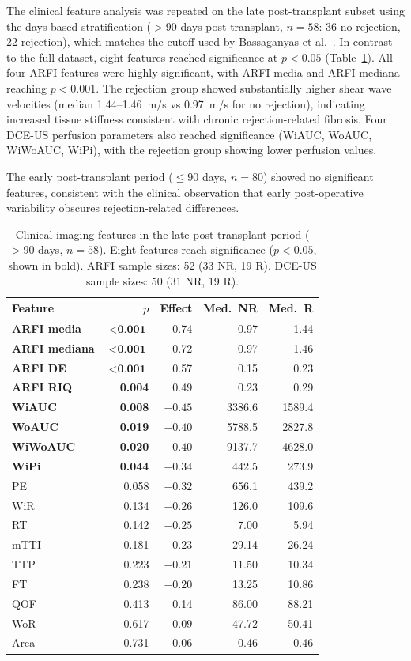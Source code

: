 The clinical feature analysis was repeated on the late post-transplant subset using the days-based stratification ($> 90$ days post-transplant, $n = 58$: 36 no rejection, 22 rejection), which matches the cutoff used by Bassaganyas et al.\ \cite{bassaganyas2025}. In contrast to the full dataset, eight features reached significance at $p < 0.05$ (Table~\ref{tab:clinical_late}). All four ARFI features were highly significant, with ARFI media and ARFI mediana reaching $p < 0.001$. The rejection group showed substantially higher shear wave velocities (median 1.44--1.46~m/s vs 0.97~m/s for no rejection), indicating increased tissue stiffness consistent with chronic rejection-related fibrosis. Four DCE-US perfusion parameters also reached significance (WiAUC, WoAUC, WiWoAUC, WiPi), with the rejection group showing lower perfusion values.

The early post-transplant period ($\leq 90$ days, $n = 80$) showed no significant features, consistent with the clinical observation that early post-operative variability obscures rejection-related differences.

\begin{table}[ht]
\centering
\caption{Clinical imaging features in the late post-transplant period ($> 90$ days, $n = 58$). Eight features reach significance ($p < 0.05$, shown in bold). ARFI sample sizes: 52 (33 NR, 19 R). DCE-US sample sizes: 50 (31 NR, 19 R).}
\label{tab:clinical_late}
\small
\begin{tabular}{lrrrr}
\toprule
Feature & $p$ & Effect & Med.\ NR & Med.\ R \\
\midrule
\textbf{ARFI media} & $< \textbf{0.001}$ & 0.74 & 0.97 & 1.44 \\
\textbf{ARFI mediana} & $< \textbf{0.001}$ & 0.72 & 0.97 & 1.46 \\
\textbf{ARFI DE} & $< \textbf{0.001}$ & 0.57 & 0.15 & 0.23 \\
\textbf{ARFI RIQ} & \textbf{0.004} & 0.49 & 0.23 & 0.29 \\
\textbf{WiAUC} & \textbf{0.008} & $-0.45$ & 3386.6 & 1589.4 \\
\textbf{WoAUC} & \textbf{0.019} & $-0.40$ & 5788.5 & 2827.8 \\
\textbf{WiWoAUC} & \textbf{0.020} & $-0.40$ & 9137.7 & 4628.0 \\
\textbf{WiPi} & \textbf{0.044} & $-0.34$ & 442.5 & 273.9 \\
PE & 0.058 & $-0.32$ & 656.1 & 439.2 \\
WiR & 0.134 & $-0.26$ & 126.0 & 109.6 \\
RT & 0.142 & $-0.25$ & 7.00 & 5.94 \\
mTTI & 0.181 & $-0.23$ & 29.14 & 26.24 \\
TTP & 0.223 & $-0.21$ & 11.50 & 10.34 \\
FT & 0.238 & $-0.20$ & 13.25 & 10.86 \\
QOF & 0.413 & 0.14 & 86.00 & 88.21 \\
WoR & 0.617 & $-0.09$ & 47.72 & 50.41 \\
Area & 0.731 & $-0.06$ & 0.46 & 0.46 \\
\bottomrule
\end{tabular}
\end{table}

